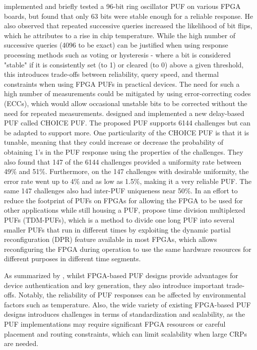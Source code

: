 \cite{stephan_nolting_2021_5706593} implemented and briefly tested a 96-bit ring oscillator PUF on various FPGA boards, but found that only 63 bits were stable enough for a reliable response. He also observed that repeated successive queries increased the likelihood of bit flips, which he attributes to a rise in chip temperature. While the high number of successive queries (4096 to be exact) can be justified when using response processing methods such as voting or hysteresis - where a bit is considered "stable" if it is consistently set (to 1) or cleared (to 0) above a given threshold, this introduces trade-offs between reliability, query speed, and thermal constraints when using FPGA PUFs in practical devices. The need for such a high number of measurements could be mitigated by using error-correcting codes (ECCs), which would allow occasional unstable bits to be corrected without the need for repeated measurements.
\cite{9556423} designed and implemented a new delay-based PUF called CHOICE PUF. The proposed PUF supports 6144 challenges but can be adapted to support more. One particularity of the CHOICE PUF is that it is tunable, meaning that they could increase or decrease the probability of obtaining 1's in the PUF response using the properties of the challenges. They also found that 147 of the 6144 challenges provided a uniformity rate between 49\% and 51\%. Furthermore, on the 147 challenges with desirable uniformity, the error rate went up to 4\% and as low as 1.5\%, making it a very reliable PUF. The same 147 challenges also had inter-PUF uniqueness near 50\%.
In an effort to reduce the footprint of PUFs on FPGAs for allowing the FPGA to be used for other applications while still housing a PUF, \cite{5547067} propose time division multiplexed PUFs (TDM-PUFs), which is a method to divide one long PUF into several smaller PUFs that run in different times by exploiting the dynamic partial reconfiguration (DPR) feature available in most FPGAs, which allows reconfiguring the FPGA during operation to use the same hardware resources for different purposes in different time segments.

As summarized by \cite{cryptography7040055}, whilst FPGA-based PUF designs provide advantages for device authentication and key generation, they also introduce important trade-offs. Notably, the reliability of PUF responses can be affected by environmental factors such as temperature. Also, the wide variety of existing FPGA-based PUF designs introduces challenges in terms of standardization and scalability, as the PUF implementations may require significant FPGA resources or careful placement and routing constraints, which can limit scalability when large CRPs are needed.

